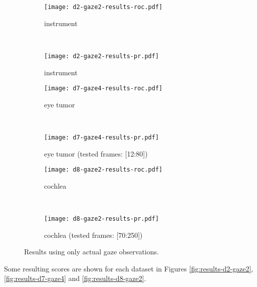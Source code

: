 \begin{figure}[ht]
	\centering
	\begin{subfigure}[h]{0.45\textwidth}
	\texttt{[image: d2-gaze2-results-roc.pdf]}	
		\caption*{instrument}
	\end{subfigure}
	~
	\begin{subfigure}[h]{0.45\textwidth}
	\texttt{[image: d2-gaze2-results-pr.pdf]}	
		\caption*{instrument}
	\end{subfigure}
	
	\vspace{3mm}
	\begin{subfigure}[h]{0.45\textwidth}
	\texttt{[image: d7-gaze4-results-roc.pdf]}	
		\caption*{eye tumor}
	\end{subfigure}
	~
	\begin{subfigure}[h]{0.45\textwidth}
	\texttt{[image: d7-gaze4-results-pr.pdf]}	
		\caption*{eye tumor (tested frames: [12:80])}
	\end{subfigure}	
	
	\vspace{3mm}
	\begin{subfigure}[h]{0.45\textwidth}
	\texttt{[image: d8-gaze2-results-roc.pdf]}	
		\caption*{cochlea}
	\end{subfigure}
	~
	\begin{subfigure}[h]{0.45\textwidth}
	\texttt{[image: d8-gaze2-results-pr.pdf]}	
		\caption*{cochlea (tested frames: [70:250])}
	\end{subfigure}		
	\caption{Results using only actual gaze observations.}
	\label{fig:results-curves}
\end{figure}

Some resulting scores are shown for each dataset in Figures \ref{fig:results-d2-gaze2}, \ref{fig:results-d7-gaze4} and \ref{fig:results-d8-gaze2}. 

